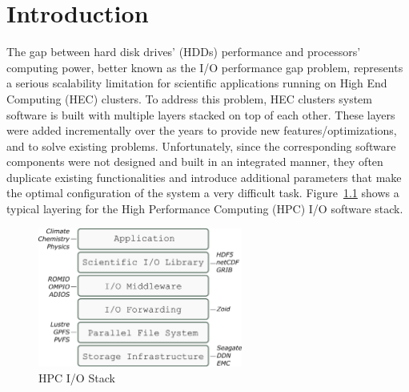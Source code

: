 \chapter{Introduction} \label{cap: introduction}
The gap between hard disk drives' (HDDs) performance and processors' computing power, better known as the I/O performance gap problem, represents a serious scalability limitation for scientific applications running on High End Computing (HEC) clusters. To address this problem, HEC clusters system software is built with multiple layers stacked on top of each other. These layers were added incrementally over the years to provide new features/optimizations, and to solve existing problems. Unfortunately, since the corresponding software components were not designed and built in an integrated manner, they often duplicate existing functionalities and introduce additional parameters that make the optimal configuration of the system a very difficult task. Figure~\ref{figure: hpc-io-stack} shows a typical layering for the High Performance Computing (HPC) I/O software stack.

\begin{figure}[!htb]
  \centering
  \includegraphics[width=0.6\textwidth]{chapters/figures/hpc-io-stack}
  \caption{HPC I/O Stack}
  \label{figure: hpc-io-stack}
\end{figure}

